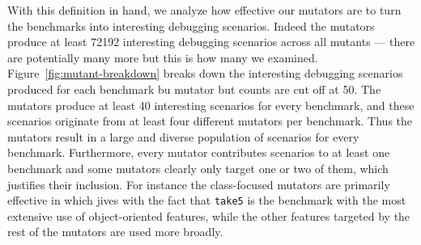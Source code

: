 With this definition in hand, we analyze how effective our mutators
are to turn the benchmarks into interesting debugging scenarios.
Indeed the mutators produce at least 72192 interesting debugging scenarios
across all mutants --- there are potentially many more but this is how
many we examined. 
Figure~\ref{fig:mutant-breakdown} breaks down the interesting
debugging scenarios produced  for each benchmark bu mutator 
but counts are cut off at 50. The mutators produce at least 40 interesting
scenarios for every benchmark, and these scenarios originate from at
least four different mutators per benchmark.  Thus the mutators result in 
a large and diverse population of scenarios for every benchmark.
Furthermore, every mutator contributes scenarios to at least one
benchmark and some mutators clearly only target one or two of them, which
justifies their inclusion. For
instance the class-focused mutators are primarily effective in
which jives with the fact that \texttt{take5} is the benchmark with 
the most extensive use of object-oriented features, while the other
features targeted by the rest of the mutators are used more broadly.
